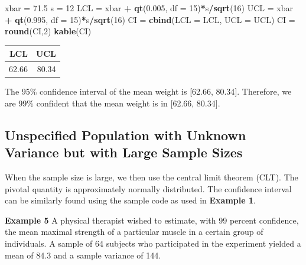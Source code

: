 \documentclass[
]{book}
\newenvironment{Shaded}{\begin{snugshade}}{\end{snugshade}}
\newcommand{\AttributeTok}[1]{\textcolor[rgb]{0.13,0.29,0.53}{#1}}
\newcommand{\DecValTok}[1]{\textcolor[rgb]{0.00,0.00,0.81}{#1}}
\newcommand{\FloatTok}[1]{\textcolor[rgb]{0.00,0.00,0.81}{#1}}
\newcommand{\FunctionTok}[1]{\textcolor[rgb]{0.13,0.29,0.53}{\textbf{#1}}}
\newcommand{\NormalTok}[1]{#1}
\newcommand{\OtherTok}[1]{\textcolor[rgb]{0.56,0.35,0.01}{#1}}
\newcommand{\SpecialCharTok}[1]{\textcolor[rgb]{0.81,0.36,0.00}{\textbf{#1}}}
\begin{document}
\begin{Shaded}
\begin{Highlighting}[]
\NormalTok{xbar }\OtherTok{=} \FloatTok{71.5}
\NormalTok{s }\OtherTok{=} \DecValTok{12}
\NormalTok{LCL }\OtherTok{=}\NormalTok{ xbar }\SpecialCharTok{+} \FunctionTok{qt}\NormalTok{(}\FloatTok{0.005}\NormalTok{, }\AttributeTok{df =} \DecValTok{15}\NormalTok{)}\SpecialCharTok{*}\NormalTok{s}\SpecialCharTok{/}\FunctionTok{sqrt}\NormalTok{(}\DecValTok{16}\NormalTok{)}
\NormalTok{UCL }\OtherTok{=}\NormalTok{ xbar }\SpecialCharTok{+} \FunctionTok{qt}\NormalTok{(}\FloatTok{0.995}\NormalTok{, }\AttributeTok{df =} \DecValTok{15}\NormalTok{)}\SpecialCharTok{*}\NormalTok{s}\SpecialCharTok{/}\FunctionTok{sqrt}\NormalTok{(}\DecValTok{16}\NormalTok{)}
\NormalTok{CI }\OtherTok{=} \FunctionTok{cbind}\NormalTok{(}\AttributeTok{LCL =}\NormalTok{ LCL, }\AttributeTok{UCL =}\NormalTok{ UCL)}
\NormalTok{CI }\OtherTok{=} \FunctionTok{round}\NormalTok{(CI,}\DecValTok{2}\NormalTok{)}
\FunctionTok{kable}\NormalTok{(CI)}
\end{Highlighting}
\end{Shaded}

\begin{tabular}{r|r}
\hline
LCL & UCL\\
\hline
62.66 & 80.34\\
\hline
\end{tabular}

The 95\% confidence interval of the mean weight is {[}62.66, 80.34{]}. Therefore, we are 99\% confident that the mean weight is in {[}62.66, 80.34{]}.

\hypertarget{unspecified-population-with-unknown-variance-but-with-large-sample-sizes}{%
\subsection{Unspecified Population with Unknown Variance but with Large Sample Sizes}\label{unspecified-population-with-unknown-variance-but-with-large-sample-sizes}}

When the sample size is large, we then use the central limit theorem (CLT). The pivotal quantity is approximately normally distributed. The confidence interval can be similarly found using the sample code as used in \textbf{Example 1}.

\textbf{Example 5} A physical therapist wished to estimate, with 99 percent confidence, the mean maximal strength of a particular muscle in a certain group of individuals. A sample of 64 subjects who participated in the experiment yielded a mean of 84.3 and a sample variance of 144.
\end{document}

